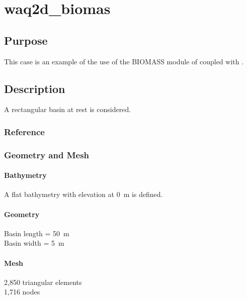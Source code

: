 \chapter{waq2d\_biomas}
%
%
\section{Purpose}
%
This case is an example of the use of the BIOMASS module of \waqtel coupled with .
%
\section{Description}
%
A rectangular basin at rest is considered.
%
%
%
%
\subsection{Reference}
%

%
%
%
\subsection{Geometry and Mesh}
%
\subsubsection{Bathymetry}
%
A flat bathymetry with elevation at 0~m is defined.
%
\subsubsection{Geometry}
%
Basin length = 50~m\\
Basin width = 5~m
%
\subsubsection{Mesh}
%
2,850 triangular elements\\
1,716 nodes
%
%
%
